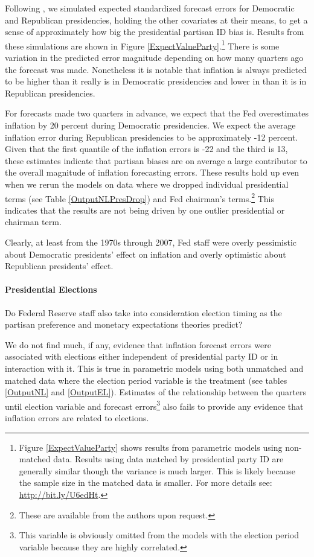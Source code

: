 \documentclass[a4paper]{article}\usepackage{graphicx, color}
\begin{document}
Following \cite{King2000}, we simulated expected standardized forecast errors for Democratic and Republican presidencies, holding the other covariates at their means, to get a sense of approximately how big the presidential partisan ID bias is. Results from these simulations are shown in Figure \ref{ExpectValueParty}.\footnote{Figure \ref{ExpectValueParty} shows results from parametric models using non-matched data. Results using data matched by presidential party ID are generally similar though the variance is much larger. This is likely because the sample size in the matched data is smaller. For more details see: \url{http://bit.ly/U6edHt}.} There is some variation in the predicted error magnitude depending on how many quarters ago the forecast was made. Nonetheless it is notable that inflation is always predicted to be higher than it really is in Democratic presidencies and lower in than it is in Republican presidencies.

For forecasts made two quarters in advance, we expect that the Fed overestimates inflation by 20 percent during Democratic presidencies. We expect the average inflation error during Republican presidencies to be approximately -12 percent. Given that the first quantile of the inflation errors is -22 and the third is 13, these estimates indicate that partisan biases are on average a large contributor to the overall magnitude of inflation forecasting errors. These results hold up even when we rerun the models on data where we dropped individual presidential terms (see Table \ref{OutputNLPresDrop}) and Fed chairman's terms.\footnote{These are available from the authors upon request.} This indicates that the results are not being driven by one outlier presidential or chairman term.

Clearly, at least from the 1970s through 2007, Fed staff were overly pessimistic about Democratic presidents' effect on inflation and overly optimistic about Republican presidents' effect. 

\paragraph{Presidential Elections}

Do Federal Reserve staff also take into consideration election timing as the partisan preference and monetary expectations theories predict? 

We do not find much, if any, evidence that inflation forecast errors were associated with elections either independent of presidential party ID or in interaction with it. This is true in parametric models using both unmatched and matched data where the election period variable is the treatment (see tables \ref{OutputNL} and \ref{OutputEL}). Estimates of the relationship between the quarters until election variable and forecast errors\footnote{This variable is obviously omitted from the models with the election period variable because they are highly correlated.} also fails to provide any evidence that inflation errors are related to elections. 
\end{document}
